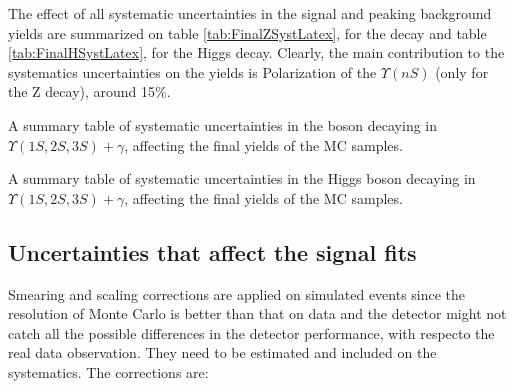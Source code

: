 The effect of all systematic uncertainties in the signal and peaking background yields are summarized on table \ref{tab:FinalZSystLatex}, for the \Z decay and table \ref{tab:FinalHSystLatex}, for the Higgs decay. Clearly, the main contribution to the systematics uncertainties on the yields is Polarization of the $\Upsilon(nS)$ (only for the Z decay), around 15\%.

\begin{table}[ht]
\begin{center}

\caption{ A summary table of systematic uncertainties in the \Z boson decaying in $\Upsilon(1S,2S,3S) + \gamma$, affecting the final yields of the MC samples.}
\label{tab:FinalZSystLatex}
\end{center}
\end{table}


\begin{table}[ht]
\begin{center}

\caption{A summary table of systematic uncertainties in the Higgs boson decaying in $ \Upsilon(1S,2S,3S) + \gamma$, affecting the final yields of the MC samples.}
\label{tab:FinalHSystLatex}
\end{center}
\end{table}


\subsection{Uncertainties that affect the signal fits}

Smearing and scaling corrections are applied on simulated events since the resolution of Monte Carlo is better than that on data and the detector might not catch all the possible differences in the detector performance, with respecto the real data observation. They need to be estimated and included on the systematics. The corrections are:

